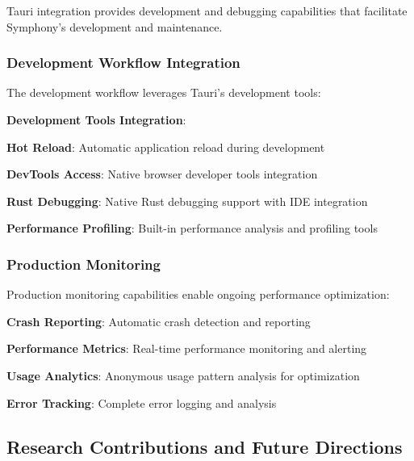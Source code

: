 Tauri integration provides development and debugging capabilities that facilitate Symphony's development and maintenance.

\subsubsection*{Development Workflow Integration}

The development workflow leverages Tauri's development tools:

\begin{successbox}
\textbf{Development Tools Integration}:
\begin{compactlist}
    \item \textbf{Hot Reload}: Automatic application reload during development
    \item \textbf{DevTools Access}: Native browser developer tools integration
    \item \textbf{Rust Debugging}: Native Rust debugging support with IDE integration
    \item \textbf{Performance Profiling}: Built-in performance analysis and profiling tools
\end{compactlist}
\end{successbox}

\subsubsection*{Production Monitoring}

Production monitoring capabilities enable ongoing performance optimization:

\begin{expandedlist}
    \item \textbf{Crash Reporting}: Automatic crash detection and reporting
    \item \textbf{Performance Metrics}: Real-time performance monitoring and alerting
    \item \textbf{Usage Analytics}: Anonymous usage pattern analysis for optimization
    \item \textbf{Error Tracking}: Complete error logging and analysis
\end{expandedlist}

\subsection*{Research Contributions and Future Directions}

